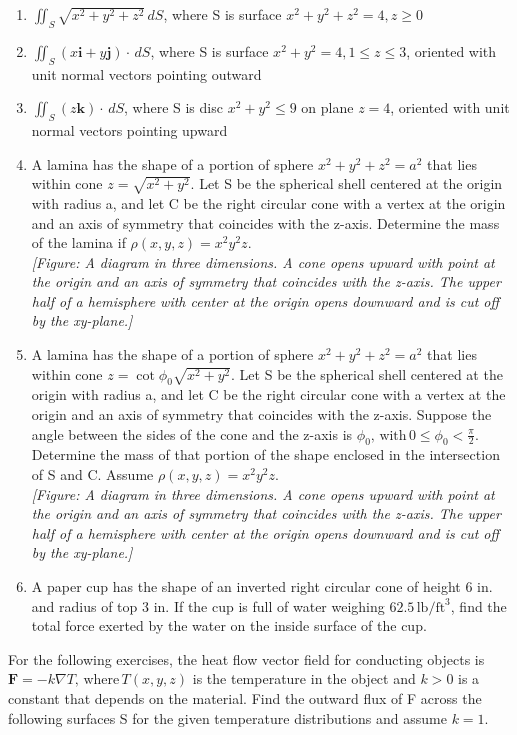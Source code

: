 \documentclass{exercises}
\begin{document}
\begin{enumerate}[resume]
\item $\iint_{S}\sqrt{x^{2}+y^{2}+z^{2}}\,dS$, where S is surface $x^{2}+y^{2}+z^{2}=4,z\ge0$
\item $\iint_{S}(x\mathbf{i}+y\mathbf{j})\cdot \,dS$, where S is surface $x^{2}+y^{2}=4,1\le z\le3$, oriented with unit normal vectors pointing outward
\item $\iint_{S}(z\mathbf{k})\cdot \,dS$, where S is disc $x^{2}+y^{2}\le9$ on plane $z=4$, oriented with unit normal vectors pointing upward
\item A lamina has the shape of a portion of sphere $x^{2}+y^{2}+z^{2}=a^{2}$ that lies within cone $z=\sqrt{x^{2}+y^{2}}$. Let S be the spherical shell centered at the origin with radius a, and let C be the right circular cone with a vertex at the origin and an axis of symmetry that coincides with the z-axis. Determine the mass of the lamina if $\rho(x,y,z)=x^{2}y^{2}z$. \\ \textit{[Figure: A diagram in three dimensions. A cone opens upward with point at the origin and an axis of symmetry that coincides with the z-axis. The upper half of a hemisphere with center at the origin opens downward and is cut off by the xy-plane.]}
\item A lamina has the shape of a portion of sphere $x^{2}+y^{2}+z^{2}=a^{2}$ that lies within cone $z=\cot \phi_{0}\sqrt{x^{2}+y^{2}}$. Let S be the spherical shell centered at the origin with radius a, and let C be the right circular cone with a vertex at the origin and an axis of symmetry that coincides with the z-axis. Suppose the angle between the sides of the cone and the z-axis is $\phi_{0},\,\text{with}\,0\le \phi_{0}<\frac{\pi}{2}$. Determine the mass of that portion of the shape enclosed in the intersection of S and C. Assume $\rho(x,y,z)=x^{2}y^{2}z$. \\ \textit{[Figure: A diagram in three dimensions. A cone opens upward with point at the origin and an axis of symmetry that coincides with the z-axis. The upper half of a hemisphere with center at the origin opens downward and is cut off by the xy-plane.]}
\item A paper cup has the shape of an inverted right circular cone of height 6 in. and radius of top 3 in. If the cup is full of water weighing $62.5\,\text{lb}/\text{ft}^{3}$, find the total force exerted by the water on the inside surface of the cup.
\end{enumerate}

For the following exercises, the heat flow vector field for conducting objects is $\mathbf{F}=-k\nabla T,\,\text{where}\,T(x,y,z)$ is the temperature in the object and $k>0$ is a constant that depends on the material. Find the outward flux of F across the following surfaces S for the given temperature distributions and assume $k=1$.
\end{document}
